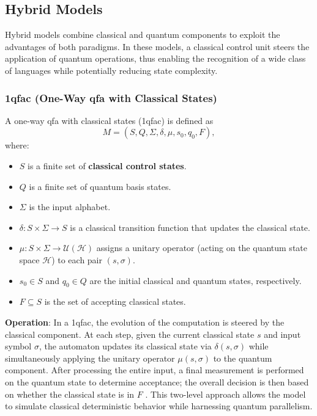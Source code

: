 \subsection{Hybrid Models}
\label{subsec:hybrid-models}

Hybrid models combine classical and quantum components to exploit the advantages of both paradigms. In these models, a classical control unit steers the application of quantum operations, thus enabling the recognition of a wide class of languages while potentially reducing state complexity.

\subsubsection{1qfac (One-Way qfa with Classical States)}
\label{sssec:1qfac}
\begin{definition}[1qfac]
A one-way qfa with classical states (\gls{1qfac}) is defined as 
\[
M = (S, Q, \Sigma, \delta, \mu, s_0, q_0, F),
\]
where:
\begin{itemize}
    \item \( S \) is a finite set of \textbf{classical control states}.
    \item \( Q \) is a finite set of quantum basis states.
    \item \( \Sigma \) is the input alphabet.
    \item \(\delta: S \times \Sigma \to S\) is a classical transition function that updates the classical state.
    \item \(\mu: S \times \Sigma \to \mathcal{U}(\mathcal{H})\) assigns a unitary operator (acting on the quantum state space \(\mathcal{H}\)) to each pair \((s,\sigma)\).
    \item \( s_0 \in S \) and \( q_0 \in Q \) are the initial classical and quantum states, respectively.
    \item \( F \subseteq S \) is the set of accepting classical states.
\end{itemize}
\end{definition}

\textbf{Operation}:  
In a \gls{1qfac}, the evolution of the computation is steered by the classical component. At each step, given the current classical state \( s \) and input symbol \( \sigma \), the automaton updates its classical state via \(\delta(s,\sigma)\) while simultaneously applying the unitary operator \(\mu(s,\sigma)\) to the quantum component. After processing the entire input, a final measurement is performed on the quantum state to determine acceptance; the overall decision is then based on whether the classical state is in \( F \) \cite{zheng2012one}. This two-level approach allows the model to simulate classical deterministic behavior while harnessing quantum parallelism.

